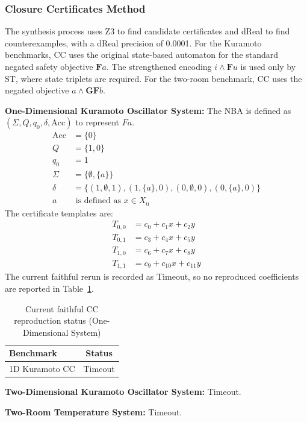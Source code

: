 \subsubsection{Closure Certificates Method}
The synthesis process uses Z3 to find candidate certificates and dReal to find counterexamples, with a dReal precision of 0.0001. For the Kuramoto benchmarks, CC uses the original state-based automaton for the standard negated safety objective $\mathbf{F}a$. The strengthened encoding $i \land \mathbf{F}u$ is used only by ST, where state triplets are required. For the two-room benchmark, CC uses the negated objective $a \land \mathbf{GF} b$.

\textbf{One-Dimensional Kuramoto Oscillator System:}
The NBA is defined as $(\Sigma, Q, q_0, \delta, \text{Acc})$ to represent $F a$.
\begin{align*}
    \text{Acc} &= \{0\} \\
    Q &= \{1, 0\} \\
    q_0 &= 1 \\
    \Sigma &= \{\emptyset, \{a\}\} \\
    \delta &= \{(1, \emptyset, 1), (1, \{a\}, 0), (0, \emptyset, 0), (0, \{a\}, 0)\} \\
	a &\text{ is defined as } x \in X_{\text{u}}
\end{align*}
The certificate templates are:
\begin{align*}
    T_{0,0} &= c_0 + c_1 x + c_2 y \\
    T_{0,1} &= c_3 + c_4 x + c_5 y \\
    T_{1,0} &= c_6 + c_7 x + c_8 y \\
    T_{1,1} &= c_9 + c_{10} x + c_{11} y
\end{align*}
The current faithful rerun is recorded as Timeout, so no reproduced coefficients are reported in Table~\ref{tab:coeff_1d}.


\begin{table}[h]
\centering
\caption{Current faithful CC reproduction status (One-Dimensional System)}
\label{tab:coeff_1d}
\begin{tabular}{lc}
\hline
\textbf{Benchmark} & \textbf{Status} \\
\hline
1D Kuramoto CC & Timeout \\
\hline
\end{tabular}
\end{table}

\textbf{Two-Dimensional Kuramoto Oscillator System:}
Timeout.

\textbf{Two-Room Temperature System:}
Timeout.

